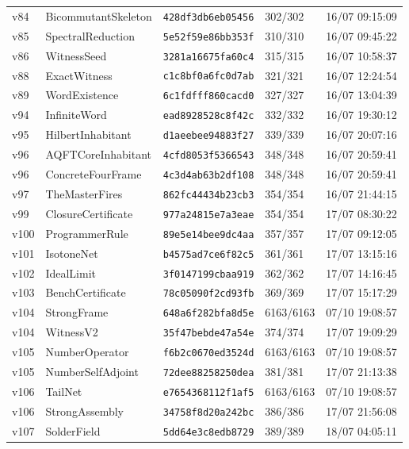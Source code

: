 \documentclass[11pt]{article}
\theoremstyle{definition}\newtheorem{deriv}{Derivation}
\begin{document}
{\begin{longtable}{@{}lllll@{}}
v84 & BicommutantSkeleton & \texttt{428df3db6eb05456} & 302/302 & 16/07 09:15:09 \\
v85 & SpectralReduction & \texttt{5e52f59e86bb353f} & 310/310 & 16/07 09:45:22 \\
v86 & WitnessSeed & \texttt{3281a16675fa60c4} & 315/315 & 16/07 10:58:37 \\
v88 & ExactWitness & \texttt{c1c8bf0a6fc0d7ab} & 321/321 & 16/07 12:24:54 \\
v89 & WordExistence & \texttt{6c1fdfff860cacd0} & 327/327 & 16/07 13:04:39 \\
v94 & InfiniteWord & \texttt{ead8928528c8f42c} & 332/332 & 16/07 19:30:12 \\
v95 & HilbertInhabitant & \texttt{d1aeebee94883f27} & 339/339 & 16/07 20:07:16 \\
v96 & AQFTCoreInhabitant & \texttt{4cfd8053f5366543} & 348/348 & 16/07 20:59:41 \\
v96 & ConcreteFourFrame & \texttt{4c3d4ab63b2df108} & 348/348 & 16/07 20:59:41 \\
v97 & TheMasterFires & \texttt{862fc44434b23cb3} & 354/354 & 16/07 21:44:15 \\
v99 & ClosureCertificate & \texttt{977a24815e7a3eae} & 354/354 & 17/07 08:30:22 \\
v100 & ProgrammerRule & \texttt{89e5e14bee9dc4aa} & 357/357 & 17/07 09:12:05 \\
v101 & IsotoneNet & \texttt{b4575ad7ce6f82c5} & 361/361 & 17/07 13:15:16 \\
v102 & IdealLimit & \texttt{3f0147199cbaa919} & 362/362 & 17/07 14:16:45 \\
v103 & BenchCertificate & \texttt{78c05090f2cd93fb} & 369/369 & 17/07 15:17:29 \\
v104 & StrongFrame & \texttt{648a6f282bfa8d5e} & 6163/6163 & 07/10 19:08:57 \\
v104 & WitnessV2 & \texttt{35f47bebde47a54e} & 374/374 & 17/07 19:09:29 \\
v105 & NumberOperator & \texttt{f6b2c0670ed3524d} & 6163/6163 & 07/10 19:08:57 \\
v105 & NumberSelfAdjoint & \texttt{72dee88258250dea} & 381/381 & 17/07 21:13:38 \\
v106 & TailNet & \texttt{e7654368112f1af5} & 6163/6163 & 07/10 19:08:57 \\
v106 & StrongAssembly & \texttt{34758f8d20a242bc} & 386/386 & 17/07 21:56:08 \\
v107 & SolderField & \texttt{5dd64e3c8edb8729} & 389/389 & 18/07 04:05:11 \\

\end{longtable}}
\end{document}
